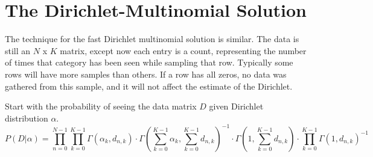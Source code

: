 \documentclass[twoside]{article}
\begin{document}
\section{The Dirichlet-Multinomial Solution}

The technique for the fast Dirichlet multinomial solution is similar. The data is still an $N$ x $K$ matrix, except now each entry is a count, representing the number of times that category has been seen while sampling that row. Typically some rows will have more samples than others.  If a row has all zeros, no data was gathered from this sample, and it will not affect the estimate of the Dirichlet.

Start with the probability of seeing the data matrix $D$ given Dirichlet distribution \(\alpha\).
\begin{equation}
P(D|\alpha)= \prod_{n=0}^{N-1}\prod_{k=0}^{K-1}\Gamma\left(\alpha_k,d_{n,k}\right)\cdot\Gamma\left(\sum_{k=0}^{K-1}\alpha_k,\sum_{k=0}^{K-1}d_{n,k}\right)^{-1}\cdot\Gamma\left(1,\sum_{k=0}^{K-1}d_{n,k}\right)\cdot\prod_{k=0}^{K-1}\Gamma\left(1,d_{n,k}\right)^{-1}
\end{equation}
\end{document}
